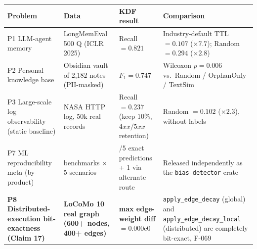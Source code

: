 {\def\LTcaptype{none} %
\begin{longtable}[]{@{}
  >{\raggedright\arraybackslash}p{}
  >{\raggedright\arraybackslash}p{}
  >{\raggedright\arraybackslash}p{}
  >{\raggedright\arraybackslash}p{}@{}}
\toprule\noalign{}
\begin{minipage}[b]{\linewidth}\raggedright
Problem
\end{minipage} & \begin{minipage}[b]{\linewidth}\raggedright
Data
\end{minipage} & \begin{minipage}[b]{\linewidth}\raggedright
KDF result
\end{minipage} & \begin{minipage}[b]{\linewidth}\raggedright
Comparison
\end{minipage} \\
\midrule\noalign{}
\endhead
\bottomrule\noalign{}
\endlastfoot
P1 LLM-agent memory & LongMemEval 500 Q (ICLR 2025) & Recall \(= 0.821\) & Industry-default TTL \(= 0.107\) (\textbf{\(\times 7.7\)}); Random \(= 0.294\) (\(\times 2.8\)) \\
P2 Personal knowledge base & Obsidian vault of 2,182 notes (PII-masked) & \(F_1 = 0.747\) & Wilcoxon \(p = 0.006\) vs.~Random / OrphanOnly / TextSim \\
P3 Large-scale log observability (static baseline) & NASA HTTP log, 50k real records & Recall \(= 0.237\) (keep \(10\%\), \(4xx/5xx\) retention) & Random \(= 0.102\) (\textbf{\(\times 2.3\)}), without labels \\
P7 ML reproducibility meta (by-product) & 5 benchmarks × 5 scenarios & 4/5 exact predictions + 1 via alternate route & Released independently as the \texttt{bias-detector} crate \\
\textbf{P8 Distributed-execution bit-exactness (Claim 17)} & \textbf{LoCoMo 10 real graph (600+ nodes, 400+ edges)} & \textbf{max edge-weight diff \(= 0.000 \text{e}0\)} & \texttt{apply\_edge\_decay} (global) and \texttt{apply\_edge\_decay\_local} (distributed) are completely bit-exact, F-069 \\

\end{longtable}}
